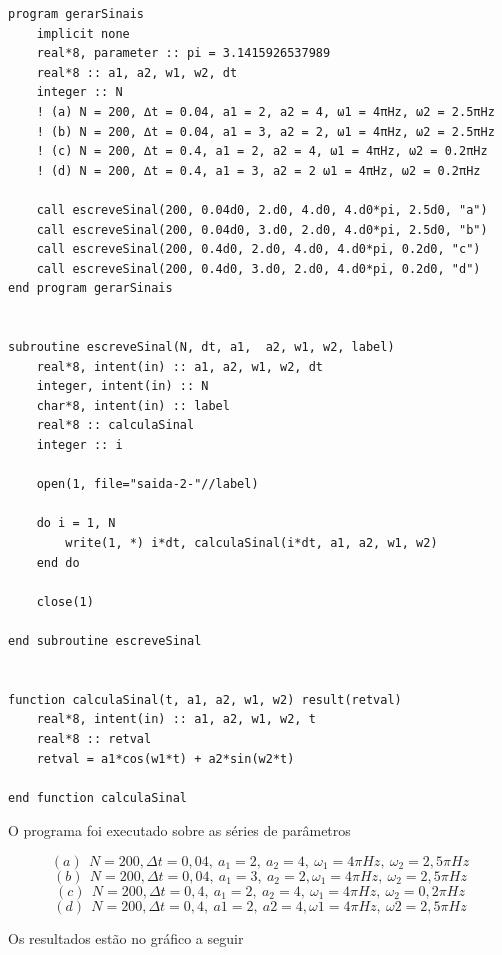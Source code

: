 \documentclass[11pt]{article}
\begin{document}
\begin{verbatim}
program gerarSinais
    implicit none
    real*8, parameter :: pi = 3.1415926537989
    real*8 :: a1, a2, w1, w2, dt
    integer :: N
    ! (a) N = 200, ∆t = 0.04, a1 = 2, a2 = 4, ω1 = 4πHz, ω2 = 2.5πHz
    ! (b) N = 200, ∆t = 0.04, a1 = 3, a2 = 2, ω1 = 4πHz, ω2 = 2.5πHz
    ! (c) N = 200, ∆t = 0.4, a1 = 2, a2 = 4, ω1 = 4πHz, ω2 = 0.2πHz
    ! (d) N = 200, ∆t = 0.4, a1 = 3, a2 = 2 ω1 = 4πHz, ω2 = 0.2πHz

    call escreveSinal(200, 0.04d0, 2.d0, 4.d0, 4.d0*pi, 2.5d0, "a")
    call escreveSinal(200, 0.04d0, 3.d0, 2.d0, 4.d0*pi, 2.5d0, "b")
    call escreveSinal(200, 0.4d0, 2.d0, 4.d0, 4.d0*pi, 0.2d0, "c")
    call escreveSinal(200, 0.4d0, 3.d0, 2.d0, 4.d0*pi, 0.2d0, "d")
end program gerarSinais


subroutine escreveSinal(N, dt, a1,  a2, w1, w2, label)
    real*8, intent(in) :: a1, a2, w1, w2, dt
    integer, intent(in) :: N
    char*8, intent(in) :: label
    real*8 :: calculaSinal
    integer :: i

    open(1, file="saida-2-"//label)

    do i = 1, N
        write(1, *) i*dt, calculaSinal(i*dt, a1, a2, w1, w2)
    end do

    close(1)

end subroutine escreveSinal


function calculaSinal(t, a1, a2, w1, w2) result(retval)
    real*8, intent(in) :: a1, a2, w1, w2, t
    real*8 :: retval
    retval = a1*cos(w1*t) + a2*sin(w2*t)

end function calculaSinal
\end{verbatim}

O programa foi executado sobre as séries de parâmetros

$$(a)\ \ N = 200, \Delta t = 0,04,\ a_1 = 2,\ a_2 = 4,\ \omega_1 = 4\pi Hz,\ \omega_2 = 2,5\pi Hz$$
$$(b)\ \ N = 200, \Delta t = 0,04,\ a_1 = 3,\ a_2 = 2, \omega_1 = 4\pi Hz,\ \omega_2 = 2,5\pi Hz$$
$$(c)\ \ N = 200, \Delta t = 0,4,\ a_1 = 2,\ a_2 = 4,\ \omega_1 = 4\pi Hz,\ \omega_2 = 0,2\pi Hz$$
$$(d)\ \ N = 200, \Delta t = 0,4,\ a1 = 2,\ a2 = 4, ω1 = 4\pi Hz,\ ω2 = 2,5\pi Hz$$

Os resultados estão no gráfico a seguir
\end{document}
